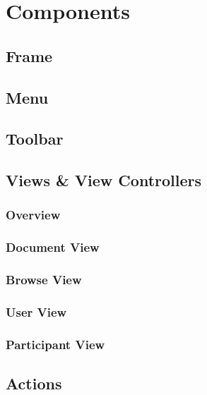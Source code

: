 \section{Components}
\label{applicationlayer_components}
\subsection{Frame}


\subsection{Menu}

\subsection{Toolbar}

\subsection{Views \& View Controllers}
\subsubsection{Overview}
\subsubsection{Document View}
\subsubsection{Browse View}
\subsubsection{User View}
\subsubsection{Participant View}

\subsection{Actions}

